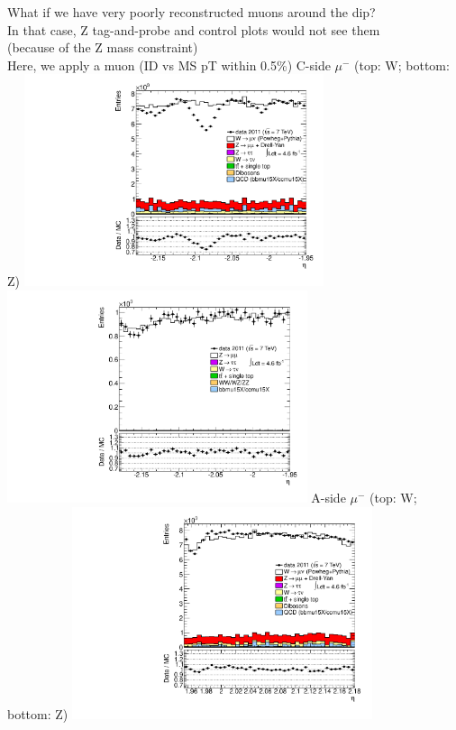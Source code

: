  {
What if we have very poorly reconstructed muons around the dip? \\
In that case, Z tag-and-probe and control plots would not see them \\
(because of the Z mass constraint) \\
Here, we apply a muon  (ID vs MS pT within 0.5\%)
}
 {
\colb[T]
C-side $\mu^{-}$ (top: W; bottom: Z)
\centering
\includegraphics[width=0.66\textwidth]{dates/20130306/figures/both/Widms_10_C_stack_l_eta_NEG} \\
\includegraphics[width=0.66\textwidth]{dates/20130306/figures/both/Zidms_10_C_stack_lN_eta_ALL.pdf}
A-side $\mu^{-}$ (top: W; bottom: Z)
\centering
\includegraphics[width=0.66\textwidth]{dates/20130306/figures/both/Widms_10_A_stack_l_eta_NEG} \\
}
